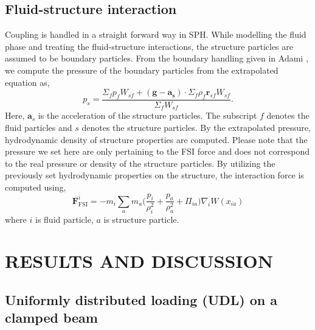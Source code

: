 \documentclass[10pt, conference]{FMFP2022}
\newcommand{\ten}[1]{\ensuremath{\mathbf{#1}}}
\begin{document}
\subsection{\textbf{Fluid-structure interaction}}\label{subsec:fsi}
Coupling is handled in a straight forward way in SPH. While modelling the fluid
phase and treating the fluid-structure interactions, the structure particles are
assumed to be boundary particles. From the boundary handling given in Adami
\cite{Adami2012}, we compute the pressure of the boundary particles from
the extrapolated equation as,
\begin{equation}
  \label{eq:pressure-bc}
  p_s = \frac{\Sigma_f p_f W_{sf} + (\ten{g} - \ten{a}_{\ten{s}}) \cdot \Sigma_f
    \rho_f \ten{r}_{sf} W_{sf}}{\Sigma_f W_{sf}}.
\end{equation}
Here, $\ten{a}_s$ is the acceleration of the structure particles. The subscript
$f$ denotes the fluid particles and $s$ denotes the structure particles. By the
extrapolated pressure, hydrodynamic density of structure properties are
computed. Please note that the pressure we set here are only pertaining to the
FSI force and does not correspond to the real pressure or density of the
structure particles. By utilizing the previously set hydrodynamic properties on
the structure, the interaction force is computed using,
\begin{equation}
  \ten{F}_{\text{FSI}}^i = -m_i \sum_{a} m_a \bigg(\frac{p_i}{\rho_{i}^2} +
  \frac{p_a}{\rho_{a}^2} + \Pi_{ia} \bigg) \nabla_{i} W(x_{ia})
\end{equation}
where $i$ is fluid particle, $a$ is structure particle.


\section{\textbf{RESULTS AND DISCUSSION}}\label{sec3}

\subsection{\textbf{Uniformly distributed loading (UDL) on a clamped beam}}
\label{sec:udl}
\end{document}
